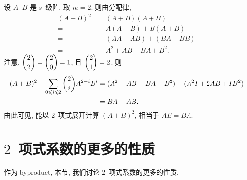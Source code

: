 \documentclass[../libro.tex]{subfiles}
\begin{document}
\begin{example}
    设 \(A\), \(B\) 是 \(s\)~级阵.
    取 \(m = 2\).
    则由分配律,
    \begin{align*}
        (A + B)^2
        = {} &
        (A + B) (A + B)
        \\
        = {} &
        A (A + B) + B (A + B)
        \\
        = {} &
        (A A + A B) + (B A + B B)
        \\
        = {} &
        A^2 + A B + B A + B^2.
    \end{align*}
    注意,
    \(\dbinom{2}{2} = \dbinom{2}{0} = 1\),
    且
    \(\dbinom{2}{1} = 2\).
    则
    \begin{align*}
        (A + B)^2 - \sum_{0 \leq i \leq 2} {\dbinom{2}{i} A^{2-i} B^i}
        = {} &
        (A^2 + A B + B A + B^2) - (A^2 I + 2 A B + I B^2)
        \\
        = {} &
        B A - A B.
    \end{align*}
    由此可见,
    能以 \(2\)~项式展开计算 \((A + B)^2\),
    相当于 \(A B = B A\).
\end{example}

\section{\texorpdfstring{\(2\)~项式系数的更多的性质}%
{2 项式系数的更多的性质}}

作为 byproduct, 本节, 我们讨论 \(2\)~项式系数的更多的性质.
\end{document}
